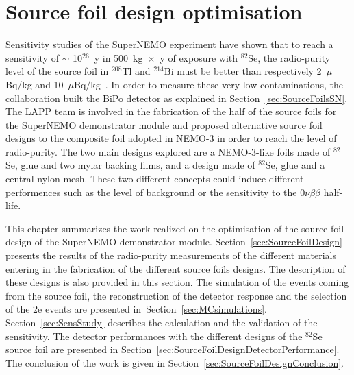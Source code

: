 \documentclass[main.tex]{subfiles}
\begin{document}
\chapter{Source foil design optimisation}




\NI Sensitivity studies of the SuperNEMO experiment have shown that to reach a sensitivity of $\sim$ 10$^{\text{26}}$~y in 500~kg~$\times$~y of exposure with $^{\text{82}}$Se, the radio-purity level of the source foil in $^{\text{208}}$Tl and $^{\text{214}}$Bi must be better than respectively 2~$\mu$Bq/kg and 10~$\mu$Bq/kg~\cite{PhysicsCaseSuperNEMO}. In order to measure these very low contaminations, the collaboration built the BiPo detector as explained in Section~\ref{sec:SourceFoilsSN}. The LAPP team is involved in the fabrication of the half of the source foils for the SuperNEMO demonstrator module and proposed alternative source foil designs to the composite foil adopted in NEMO-3 in order to reach the level of radio-purity. The two main designs explored are a NEMO-3-like foils made of $^{\text{82}}$Se, glue and two mylar backing films, and a design made of $^{\text{82}}$Se, glue and a central nylon mesh. These two different concepts could induce different performences such as the level of background or the sensitivity to the 0$\nu\beta\beta$ half-life. 



\bigskip


\NI This chapter summarizes the work realized on the optimisation of the source foil design of the SuperNEMO demonstrator module. Section~\ref{sec:SourceFoilDesign} presents the results of the radio-purity measurements of the different materials entering in the fabrication of the different source foils designs. The description of these designs is also provided in this section. The simulation of the events coming from the source foil, the reconstruction of the detector response and the selection of the 2e events are presented in~Section~\ref{sec:MCsimulations}. Section~\ref{sec:SensStudy} describes the calculation and the validation of the sensitivity. The detector performances with the different designs of the $^{\text{82}}$Se source foil are presented in Section~\ref{sec:SourceFoilDesignDetectorPerformance}. The conclusion of the work is given in Section~\ref{sec:SourceFoilDesignConclusion}.
\end{document}
